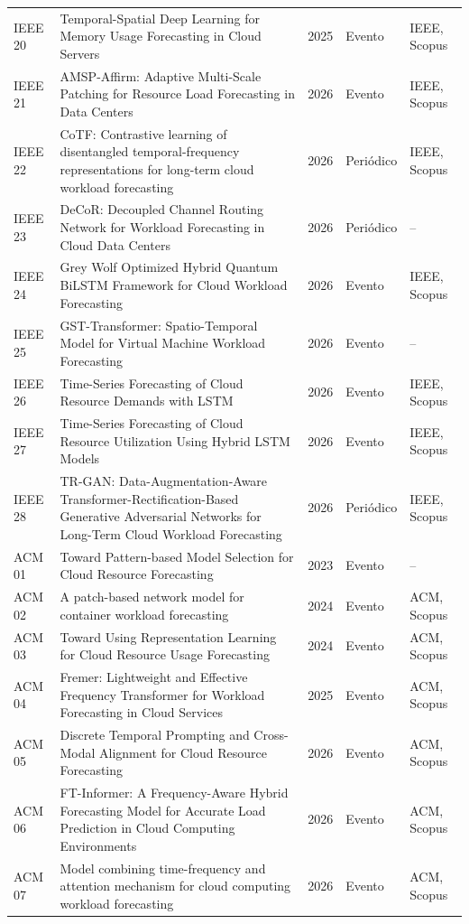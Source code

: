 {\begin{longtable}{p{1.4cm}p{9.3cm}p{0.9cm}p{1.5cm}p{1.7cm}}
IEEE 20 & Temporal-Spatial Deep Learning for Memory Usage Forecasting in Cloud Servers \cite{kai2025} & 2025 & Evento & IEEE, Scopus \\
IEEE 21 & AMSP-Affirm: Adaptive Multi-Scale Patching for Resource Load Forecasting in Data Centers \cite{zhao2026} & 2026 & Evento & IEEE, Scopus \\
IEEE 22 & CoTF: Contrastive learning of disentangled temporal-frequency representations for long-term cloud workload forecasting \cite{lv2026} & 2026 & Periódico & IEEE, Scopus \\
IEEE 23 & DeCoR: Decoupled Channel Routing Network for Workload Forecasting in Cloud Data Centers \cite{mahbub2026} & 2026 & Periódico & -- \\
IEEE 24 & Grey Wolf Optimized Hybrid Quantum BiLSTM Framework for Cloud Workload Forecasting \cite{kaim2026} & 2026 & Evento & IEEE, Scopus \\
IEEE 25 & GST-Transformer: Spatio-Temporal Model for Virtual Machine Workload Forecasting \cite{shi2026} & 2026 & Evento & -- \\
IEEE 26 & Time-Series Forecasting of Cloud Resource Demands with LSTM \cite{kollu2026} & 2026 & Evento & IEEE, Scopus \\
IEEE 27 & Time-Series Forecasting of Cloud Resource Utilization Using Hybrid LSTM Models \cite{sanikal2026} & 2026 & Evento & IEEE, Scopus \\
IEEE 28 & TR-GAN: Data-Augmentation-Aware Transformer-Rectification-Based Generative Adversarial Networks for Long-Term Cloud Workload Forecasting \cite{sun2026} & 2026 & Periódico & IEEE, Scopus \\
ACM 01 & Toward Pattern-based Model Selection for Cloud Resource Forecasting \cite{christofidi2023b} & 2023 & Evento & -- \\
ACM 02 & A patch-based network model for container workload forecasting \cite{ye2024} & 2024 & Evento & ACM, Scopus \\
ACM 03 & Toward Using Representation Learning for Cloud Resource Usage Forecasting \cite{ghorab2024} & 2024 & Evento & ACM, Scopus \\
ACM 04 & Fremer: Lightweight and Effective Frequency Transformer for Workload Forecasting in Cloud Services \cite{ye2025} & 2025 & Evento & ACM, Scopus \\
ACM 05 & Discrete Temporal Prompting and Cross-Modal Alignment for Cloud Resource Forecasting \cite{qiu2026} & 2026 & Evento & ACM, Scopus \\
ACM 06 & FT-Informer: A Frequency-Aware Hybrid Forecasting Model for Accurate Load Prediction in Cloud Computing Environments \cite{zhang2026a} & 2026 & Evento & ACM, Scopus \\
ACM 07 & Model combining time-frequency and attention mechanism for cloud computing workload forecasting \cite{zhang2026b} & 2026 & Evento & ACM, Scopus \\
\end{longtable}
}
